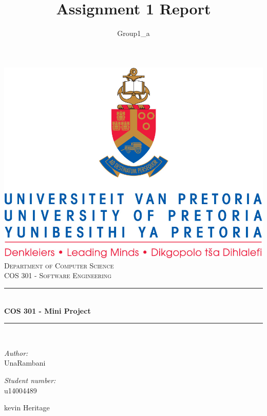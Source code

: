 \documentclass[a4paper,12pt]{report}
\author{Group1_a}
\title{ Assignment 1 Report}
\newcommand{\HRule}{\rule{\linewidth}{0.5mm}}
\begin{document}
\setlength{\parskip}{6pt}

\begin{titlepage}

\begin{center}
\includegraphics[width=1\textwidth]{./up-logo.jpg}\\[0.4cm]    
\textsc{\LARGE Department of Computer Science}\\[1.5cm]
\textsc{\Large COS 301 - Software Engineering}\\[0.5cm]
\HRule \\[0.4cm]
{ \huge \bfseries COS 301 - Mini Project}\\[0.4cm]
\HRule \\[0.4cm]
\begin{minipage}{0.4\textwidth}
\begin{flushleft} \large
\emph{Author:}\\
Una{Rambani}
\end{flushleft}
\end{minipage}
\begin{minipage}{0.4\textwidth}
\begin{flushright} \large
\emph{Student number:} \\
u14004489
\end{flushright}
\end{minipage}
\begin{minipage}{0.4\textwidth}
\begin{flushleft} \large
kevin {Heritage}
\end{flushleft}
\end{minipage}

\end{center}
\end{titlepage}
\end{document}
